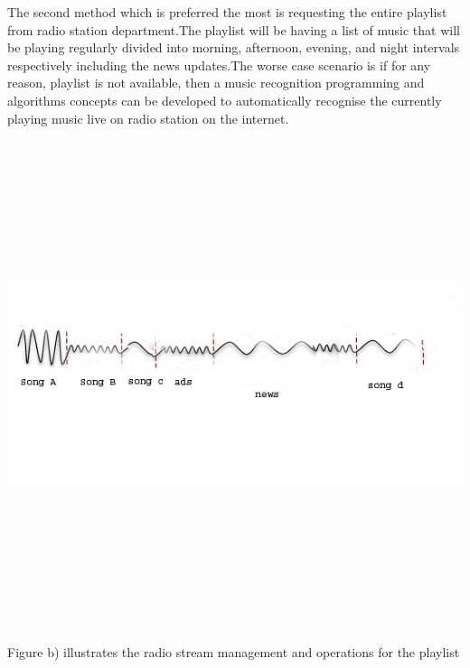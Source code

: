 The second method which is preferred the most is requesting the entire playlist from radio station department.The playlist will be having a list of music that will be playing regularly divided into morning, afternoon, evening, and night intervals respectively including the news updates.The worse case scenario is if for any reason, playlist is not available, then a music recognition programming and algorithms concepts can be developed to automatically recognise the currently playing music live on radio station on the internet.\\
\includegraphics[width=15cm,height=15cm,keepaspectratio]{Figures/3.jpg}\\ Figure b) illustrates the radio stream management and operations for the playlist\\

